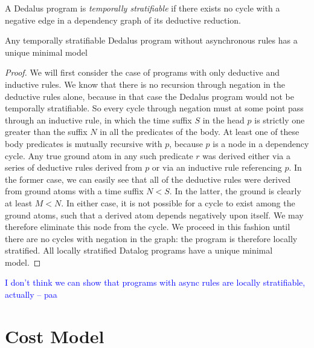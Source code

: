 \documentclass{acm_proc_article-sp-sigmod09}
\newcommand{\paa}[1]{{\textcolor{blue}{#1 -- paa}}}
\begin{document}
\begin{definition}
A Dedalus program is \emph{temporally stratifiable} if there exists no cycle with a negative edge in a dependency graph of
its deductive reduction.
\end{definition}

\begin{lemma}
Any temporally stratifiable Dedalus program without asynchronous rules has a unique minimal model
\end{lemma}
\begin{proof}
We will first consider the case of programs with only deductive and inductive rules.  We know that there is no recursion
through negation in the deductive rules alone, because in that case the Dedalus program would not be temporally 
stratifiable.  So every cycle through negation must at some point pass through an inductive rule, in which the time suffix $S$ in
the head $p$ is strictly one greater than the suffix $N$ in all the predicates of the body.  At least one of these body predicates is mutually recursive
with $p$, because $p$ is a node in a dependency cycle.  Any true ground atom in any such predicate $r$
was derived either via a series of deductive rules derived from $p$ or via an inductive rule referencing $p$.  In the former case, we can
easily see that all of the deductive rules were derived from ground atoms with a time suffix $N < S$.  In the latter, the ground is clearly at 
least $M < N$.  In either case, it is not possible for a cycle to exist among the ground atoms, such that a derived atom depends negatively upon itself.
We may therefore eliminate this node from the cycle.  We proceed in this fashion until there are no cycles with negation in the graph: the program is 
therefore locally stratified.  All locally stratified Datalog programs have a unique minimal model.


\end{proof}

\paa{I don't think we can show that programs with async rules are locally stratifiable, actually}

\section{Cost Model}
 
\end{document}

